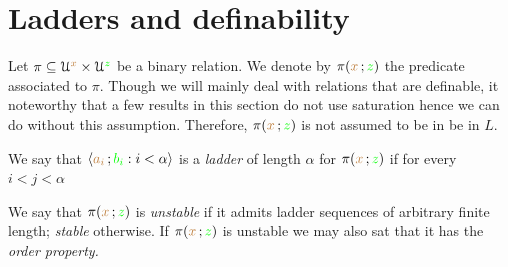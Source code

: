 \section{Ladders and definability}\label{ladders}

Let $\pi\subseteq\EuScript U^{\color{brown} x}\times\EuScript U^{\color{green} z}$ be a binary relation.
We denote by $\pi({\color{brown} x}\,;{\color{green} z})$ the predicate associated to $\pi$. Though we will mainly deal with relations that are definable, it noteworthy that a few results in this section do not use saturation hence we can do without this assumption.
Therefore, $\pi({\color{brown} x}\,;{\color{green} z})$ is not assumed to be in be in $L$.

We say that $\langle{\color{brown}a_i}\,;{\color{green} b_i} : i<\alpha\rangle$ is a \emph{ladder\/} of length $\alpha$ for $\pi({\color{brown} x}\,;{\color{green} z})$ if for every $i<j<\alpha$


We say that $\pi({\color{brown} x}\,;{\color{green} z})$ is \emph{unstable\/} if it admits ladder sequences of arbitrary finite length; \emph{stable\/} otherwise.
If $\pi({\color{brown} x}\,;{\color{green} z})$  is unstable we may also sat that it has the \emph{order property.}





